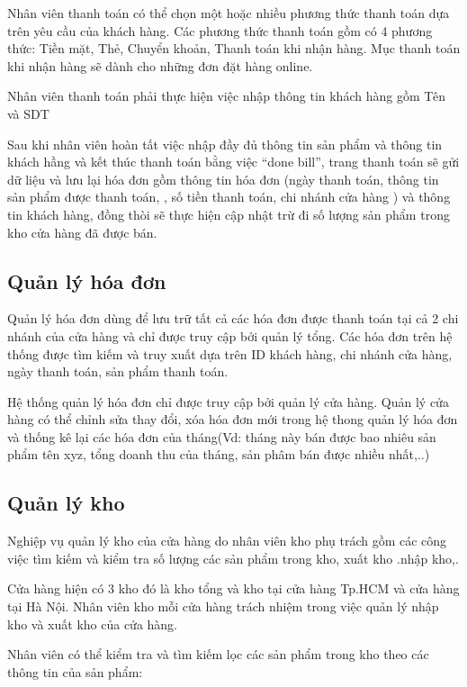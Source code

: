 \documentclass{article}
\begin{document}
Nhân viên thanh toán có thể chọn một hoặc nhiều phương thức thanh toán dựa trên yêu cầu của khách hàng. Các phương thức thanh toán gồm có 4 phương thức: Tiền mặt, Thẻ, Chuyển khoản, Thanh toán khi nhận hàng. Mục thanh toán khi nhận hàng sẽ dành cho những đơn đặt hàng online. 

Nhân viên thanh toán phải thực hiện việc nhập thông tin khách hàng gồm Tên và SDT 

Sau khi nhân viên hoàn tất việc nhập đầy đủ thông tin sản phẩm và thông tin khách hầng và kết thúc thanh toán bằng việc “done bill”, trang thanh toán sẽ gửi dữ liệu và lưu lại hóa đơn gồm thông tin hóa đơn (ngày thanh toán, thông tin sản phẩm được thanh toán, , số tiền thanh toán, chi nhánh cửa hàng ) và thông tin khách hàng, đồng thòi sẽ thực hiện cập nhật trừ đi số lượng sản phẩm trong kho cửa hàng đã được bán.

\fontsize{14}{20}\selectfont\subsection{Quản lý hóa đơn}

Quản lý hóa đơn dùng để lưu trữ tất cả các hóa đơn được thanh toán tại cả 2 chi nhánh của cửa hàng và chỉ được truy cập bởi quản lý tổng. Các hóa đơn trên hệ thống được tìm kiếm và truy xuất dựa trên ID khách hàng, chi nhánh cửa hàng, ngày thanh toán, sản phẩm thanh toán. 

Hệ thống quản lý hóa đơn chỉ được truy cập bởi quản lý cửa hàng. Quản lý cửa hàng có thể chỉnh sửa thay đổi, xóa hóa đơn mới trong hệ thong quản lý hóa đơn và thống kê lại các hóa đơn của tháng(Vd: tháng này bán được bao nhiêu sản phẩm tên xyz, tổng doanh thu của tháng,  sản phâm bán được nhiều nhất,..)

\fontsize{14}{20}\selectfont\subsection{Quản lý kho}
\fontsize{13}{20}\selectfont
Nghiệp vụ quản lý kho của cửa hàng do nhân viên kho phụ trách gồm các công việc tìm kiếm và kiểm tra số lượng các sản phẩm trong kho, xuất kho .nhập kho,. 

Cửa hàng hiện có 3 kho đó là kho tổng và kho tại cửa hàng Tp.HCM và cửa hàng tại Hà Nội. Nhân viên kho mỗi cửa hàng trách nhiệm trong việc quản lý nhập kho và xuất kho của cửa hàng. 

Nhân viên có thể kiểm tra và tìm kiếm lọc các sản phẩm trong kho theo các thông tin của sản phẩm:
\end{document}
